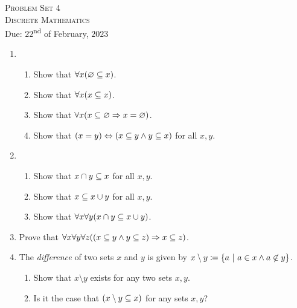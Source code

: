 




\begin{center}
    \textsc{\huge Problem Set 4}\\
    \textsc{Discrete Mathematics}\\
    {\color{gruvred}Due: $22$\textsuperscript{nd} of February, $2023$}
\end{center}

\begin{enumerate}
    \item
        \begin{enumerate}
            \item
                Show that \(\forall x \pn*{\emptyset \subseteq x}\).
            \item
                Show that \(\forall x \pn*{x \subseteq x}\).
            \item
                Show that \(\forall x \pn*{x \subseteq \emptyset \implies x = \emptyset}\).
            \item
                Show that \(\pn*{x = y} \iff \pn*{x \subseteq y \meet y \subseteq x}\) for all \(x, y\).
        \end{enumerate}
    \item
        \begin{enumerate}
            \item
                Show that \(x \cap y \subseteq x\) for all \(x, y\).
            \item
                Show that \(x \subseteq x \cup y\) for all \(x, y\).
            \item
                Show that \(\forall x \forall y \pn*{x \intersect y \subseteq x \union y}\).
        \end{enumerate}
    \item
        Prove that \(\forall x \forall y \forall z \pn*{\pn*{x \subseteq y \meet y \subseteq z}
                                                        \implies x \subseteq z}\).
    \item
        The \emph{difference} of two sets \(x\) and \(y\) is given by
        \(x \setminus y \defn \set*{a \suchthat a \in x \meet a \not \in y}\).
        \begin{enumerate}
            \item
                Show that \(x \setminus y\) exists for any two sets \(x, y\).
            \item
                Is it the case that \(\pn*{x \setminus y \subseteq x}\) for any sets \(x, y\)?

\end{enumerate}
\end{enumerate}
